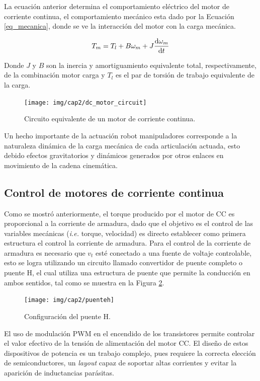 La ecuación anterior determina el comportamiento eléctrico del motor de corriente continua, el comportamiento mecánico esta dado por la Ecuación \ref{eq_mecanica}, donde se ve la interacción del motor con la carga mecánica.

\begin{equation}\label{eq_mecanica}
T_m = T_l + B \omega_m + J \dv{\omega_m}{t}
\end{equation}

Donde $J$ y $B$ son la inercia y amortiguamiento equivalente total, respectivamente, de la combinación motor carga y $T_l$ es el par de torsión de trabajo equivalente de la carga.

\begin{figure}[H]
  \centering
  \texttt{[image: img/cap2/dc\_motor\_circuit]}
  \caption{Circuito equivalente de un motor de corriente continua.}
  \label{cap2_dc_motor}
\end{figure}

Un hecho importante de la actuación robot manipuladores corresponde a la naturaleza dinámica de la carga mecánica de cada articulación actuada, esto debido efectos gravitatorios y dinámicos generados por otros enlaces en movimiento de la cadena cinemática.


\subsection{Control de motores de corriente continua}

Como se mostró anteriormente, el torque producido por el motor de CC es proporcional a la corriente de armadura, dado que el objetivo es el control de las variables mecánicas (\textit{i.e.} torque, velocidad) es directo establecer como primera estructura el control la corriente de armadura. Para el control de la corriente de armadura es necesario que $v_t$ esté conectado a una fuente de voltaje controlable, esto se logra utilizando un circuito llamado convertidor de puente completo o puente H, el cual utiliza una estructura de puente que permite la conducción en ambos sentidos, tal como se muestra en la Figura \ref{cap2_punteh}.

\begin{figure}[ht]
  \centering
  \texttt{[image: img/cap2/puenteh]}
  \caption{Configuración del puente H.}
  \label{cap2_punteh}
\end{figure}

El uso de modulación PWM en el encendido de los transistores permite controlar el valor efectivo de la tensión de alimentación del motor CC. El diseño de estos dispositivos de potencia es un trabajo complejo, pues requiere la correcta elección de semiconductores, un \textit{layout} capaz de soportar altas corrientes y evitar la aparición de inductancias parásitas.

